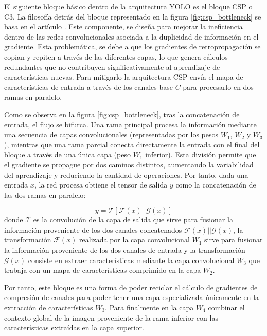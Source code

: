 \documentclass{article}
\begin{document}
	El siguiente bloque básico dentro de la arquitectura YOLO es el bloque CSP o C3. La filosofía detrás del bloque representado en la figura \ref{fig:csp_bottleneck} se basa en el artículo \cite{wang2019cspnetnewbackboneenhance}. Este componente, se diseña para mejorar la ineficiencia dentro de las redes convolucionales asociada a la duplicidad de información en el gradiente.	Esta problemática, se debe a que los gradientes de retropropagación se copian y repiten a través de las diferentes capas, lo que genera cálculos redundantes que no contribuyen significativamente al aprendizaje de características nuevas. Para mitigarlo la arquitectura CSP envía el mapa de características de entrada a través de los canales base $C$ para procesarlo en dos ramas en paralelo.
	
	
	 Como se observa en la figura \ref{fig:csp_bottleneck}, tras la concatenación de entrada, el flujo se bifurca. Una rama principal procesa la información mediante una secuencia de capas convolucionales (representadas por los pesos $W_1$, $W_2$ y $W_3$), mientras que una rama parcial conecta directamente la entrada con el final del bloque a través de una única capa (peso $W_1$ inferior). Esta división permite que el gradiente se propague por dos caminos distintos, aumentando la variabilidad del aprendizaje y reduciendo la cantidad de operaciones. Por tanto, dada una entrada \(x\),  la red procesa obtiene el tensor de salida \(y\) como la concatenación de las dos ramas en paralelo:
	
	\begin{equation} 
		y = \mathcal{T}[\mathcal{F}(x)|| \mathcal{G}(x)]
	\end{equation}
	donde \(\mathcal{T}\) es la convolución de la capa de salida que sirve para fusionar la información proveniente de los dos canales concatenados \(\mathcal{F}(x)|| \mathcal{G}(x)\), la transformación \(\mathcal{F}(x)\) realizada por la capa convolucional \(W_1\) sirve para fusionar la información proveniente de los dos canales de entrada y la transformación \(\mathcal{G}(x)\) consiste en extraer características mediante la capa convolucional \(W_3\) que trabaja con un mapa de características comprimido en la capa \(W_2\).
	
	
	Por tanto, este bloque es una forma de poder reciclar el cálculo de gradientes de compresión de canales para poder tener una capa especializada únicamente en la extracción de características \(W_3\).   Para finalmente en la capa \(W_4\) combinar el contexto global de la imagen proveniente de la rama inferior con las características extraídas en la capa superior.
	
\end{document}
